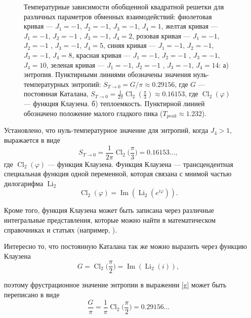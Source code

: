 \documentclass[utf8,12pt]{jetp}
\DeclareMathOperator{\Cl}{Cl}
\DeclareMathOperator{\Li}{Li}
\DeclareMathOperator{\im}{Im}
\begin{document}
\begin{figure}[h]
\begin{minipage}[h]{0.5\linewidth}
	\end{minipage}
	\caption{Температурные зависимости обобщенной квадратной решетки для различных параметров обменных взаимодействий: фиолетовая кривая --- $J_1 = -1$, $J_2 = -1$, $J_3 = -1$, $J_4 = 1$, желтая кривая --- $J_1 = -1$, $J_2 = -1$ , $J_3 = -1$, $J_4 = 2$, розовая кривая --- $J_1 = -1$, $J_2 = -1$ , $J_3 = -1$, $J_4 = 5$, синяя кривая --- $J_1 = -1$, $J_2 = -1$, $J_3 = -1$, $J_4 = 8$, красная кривая --- $J_1 = -1$, $J_2 = -1$ , $J_3 = -1$, $J_4 = 10$, зеленая кривая --- $J_1 = -1$, $J_2 = -1$ , $J_3 = -1$, $J_4 = 14$: а) энтропия. Пунктирными линиями обозначены значения нуль-температурных энтропий: $S_{T\rightarrow 0} = G/\pi\approx 0.29156$, где $G$ --- постоянная Каталана, $S_{T\rightarrow 0} = \frac{1}{2\pi} \Cl_2 (\frac{\pi}{3})\approx0.16153$, где $\Cl_2 (\varphi)$ --- функция Клаузена. б) теплоемкость. Пунктирной линией обозначено положение малого гладкого пика ($T_{peak}\approx1.232$). }
	\label{Peak}
\end{figure}

Установлено, что нуль-температурное значение для энтропий, когда $J_4>1$, выражается в виде    
\begin{equation}
S_{T\rightarrow 0} = \frac{1}{2\pi} \Cl_2 \bigg(\frac{\pi}{3}\bigg)   = 0.16153\dots, 
\label{cl}
\end{equation} 
где  $\Cl_2 (\varphi)$ --- функция Клаузена. Функция Клаузена --- трансцендентная специальная функция одной переменной, которая связана с мнимой частью дилогарифма $\Li_2$
\begin{equation*}
\Cl_2 (\varphi) = \im (\Li_2 (e^{i \varphi})).
\end{equation*}

Кроме того, функция Клаузена может быть записана через различные интегральные представления, которые можно найти в математическом справочниках и статьях (например, \cite{abramowitz_stegun1972, wood1968}).

Интересно то, что постоянную Каталана так же можно выразить через функцию Клаузена~\cite{wood1968}
\begin{equation*}
G = \Cl_2 \bigg(\frac{\pi}{2}\bigg) = \im (\Li_2 (i)),
\end{equation*}

\noindent поэтому фрустрационное значение энтропии в выражении \eqref{g} может быть переписано в виде
\begin{equation}
\frac{G}{\pi} = \frac{1}{\pi} \Cl_2 \bigg(\frac{\pi}{2}\bigg) = 0.29156\dots
\end{equation}
\end{document}
